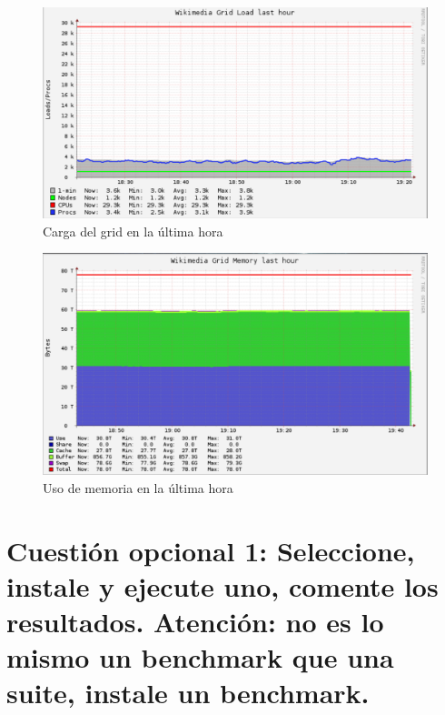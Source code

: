 \begin{figure}[H] %
	\centering
	\includegraphics[scale=0.35]{figuras/figura15.png}  %
	
	
	\caption{Carga del grid en la última hora}
	\label{figura15}
\end{figure}
\begin{figure}[H] %
	\centering
	\includegraphics[scale=0.35]{figuras/figura16.png}  %
	
	
	\caption{Uso de memoria en la última hora}
	\label{figura16}
\end{figure}



\section{Cuestión opcional 1: Seleccione, instale y ejecute uno, comente los resultados. Atención: no es lo mismo un benchmark que una suite, instale un benchmark.}

